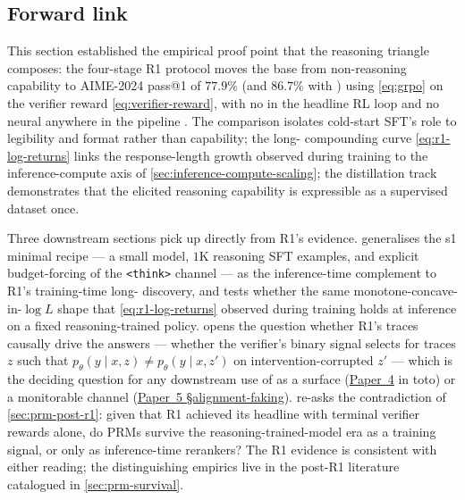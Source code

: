 \subsection{Forward link}
\label{sec:r1-forward}

This section established the empirical proof point that the
reasoning triangle composes: the four-stage R1 protocol moves the
 base from non-reasoning capability to AIME-2024 pass@1
of $77.9\%$ (and $86.7\%$ with ) using 
\cref{eq:grpo} on the verifier reward \cref{eq:verifier-reward}, with
no  in the headline RL loop and no neural  anywhere
in the pipeline \citep[\S 2.2]{deepseek-r1}. The  comparison
isolates cold-start SFT's role to legibility and format rather than
capability; the long- compounding curve \cref{eq:r1-log-returns}
links the response-length growth observed during training to the
inference-compute axis of \cref{sec:inference-compute-scaling}; the
distillation track \citep[\S 4]{deepseek-r1} demonstrates that the
elicited reasoning capability is expressible as a supervised dataset
once.

Three downstream sections pick up directly from R1's evidence.
 generalises the s1 \citep{s1-2025} minimal
recipe --- a small model, $1$K reasoning SFT examples, and explicit
budget-forcing of the \texttt{<think>} channel --- as the
inference-time complement to R1's training-time long- discovery,
and tests whether the same monotone-concave-in-$\log L$ shape that
\cref{eq:r1-log-returns} observed during training holds at inference
on a fixed reasoning-trained policy.
 opens the question whether R1's traces
causally drive the answers --- whether the verifier's binary signal
selects for traces $z$ such that
$p_\theta(y \mid x, z) \neq p_\theta(y \mid x, z')$ on
intervention-corrupted $z'$ --- which is the deciding question
for any downstream use of  as a  surface (\hyperref[P4-sec:introduction]{Paper~4}
in toto) or a monitorable channel (\hyperref[P5-sec:alignment-faking]{Paper~5 §alignment-faking}).
 re-asks the
contradiction of \cref{sec:prm-post-r1}: given that R1 achieved its
headline with terminal verifier rewards alone, do PRMs survive the
reasoning-trained-model era as a training signal, or only as
inference-time rerankers? The R1 evidence is consistent with either
reading; the distinguishing empirics live in the post-R1 
literature catalogued in \cref{sec:prm-survival}.

